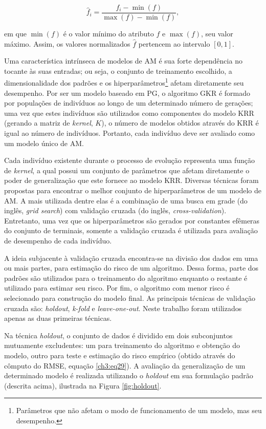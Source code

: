 \begin{equation}
    \label{eq:ch4-1}
    \hat{f}_i = \frac{f_i - \min(f)}{\max(f) - \min(f)},
\end{equation}

\noindent em que $\min(f)$ é o valor mínimo do atributo $f$ e $\max(f)$, seu valor máximo. Assim, os valores normalizados $\hat{f}$ pertencem ao intervalo $[0, 1]$.

Uma característica intrínseca de modelos de AM é sua forte dependência no tocante às suas entradas; ou seja, o conjunto de treinamento escolhido, a dimensionalidade dos padrões e os hiperparâmetros\footnote{Parâmetros que não afetam o modo de funcionamento de um modelo, mas seu desempenho.} afetam diretamente seu desempenho. Por ser um modelo baseado em PG, o algoritmo GKR é formado por populações de indivíduos ao longo de um determinado número de gerações; uma vez que estes indivíduos são utilizados como componentes do modelo KRR (gerando a matriz de \textit{kernel}, $K$), o número de modelos obtidos através do KRR é igual ao número de indivíduos. Portanto, cada indivíduo deve ser avaliado como um modelo único de AM.

Cada indivíduo existente durante o processo de evolução representa uma função de \textit{kernel}, a qual possui um conjunto de parâmetros que afetam diretamente o poder de generalização que este fornece ao modelo KRR. %
Diversas técnicas foram propostas para encontrar o melhor conjunto de hiperparâmetros de um modelo de AM. A mais utilizada dentre elas é a combinação de uma busca em grade (do inglês, \textit{grid search}) com validação cruzada (do inglês, \textit{cross-validation}). Entretanto, uma vez que os hiperparâmetros são gerados por constantes efêmeras do conjunto de terminais, somente a validação cruzada é utilizada para avaliação de desempenho de cada indivíduo.

A ideia subjacente à validação cruzada encontra-se na divisão dos dados em uma ou mais partes, para estimação do risco de um algoritmo. Dessa forma, parte dos padrões são utilizados para o treinamento do algoritmo enquanto o restante é utilizado para estimar seu risco. Por fim, o algoritmo com menor risco é selecionado para construção do modelo final. As principais técnicas de validação cruzada são: \textit{holdout}, \textit{k-fold} e \textit{leave-one-out}. Neste trabalho foram utilizados apenas as duas primeiras técnicas.

Na técnica \textit{holdout}, o conjunto de dados é dividido em dois subconjuntos mutuamente excludentes: um para treinamento do algoritmo e obtenção do modelo, outro para teste e estimação do risco empírico (obtido através do cômputo do RMSE, equação \ref{ch3:eq29}). A avaliação da generalização de um determinado modelo é realizada utilizando o \textit{holdout} em sua formulação padrão (descrita acima), ilustrada na Figura \ref{fig:holdout}.

